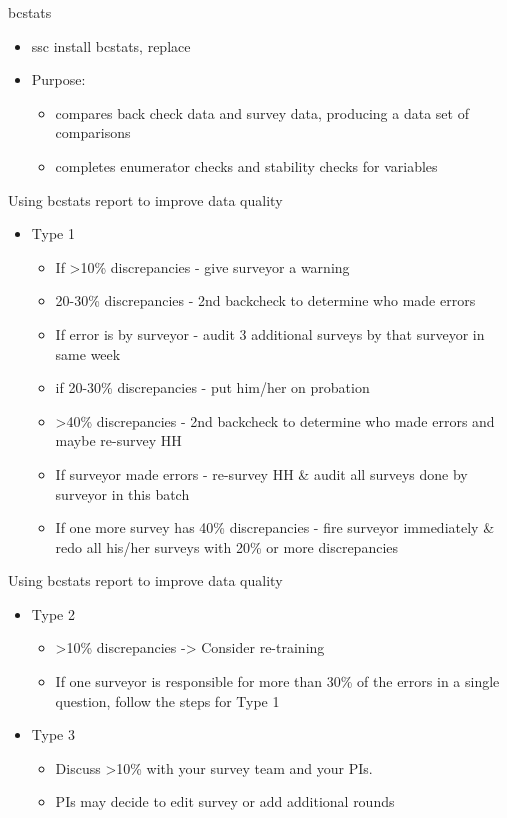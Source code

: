 \documentclass[aspectratio=169]{beamer}
\begin{document}
\begin{frame}{bcstats}
\begin{itemize}
	\item ssc install bcstats, replace
	\item Purpose:
	\begin{itemize}
		\item compares back check data and survey data, producing a data set of comparisons
		\item completes enumerator checks and stability checks for variables
	\end{itemize}
\end{itemize}
\end{frame}

\begin{frame}{Using bcstats report to improve data quality}
\begin{itemize}
	\item Type 1
		\begin{itemize}
			\item If >10\% discrepancies  - give surveyor a warning
			\item 20-30\% discrepancies - 2nd backcheck to determine who made errors
			\item If error is by surveyor  - audit 3 additional surveys by that surveyor in same week 
			\item if 20-30\% discrepancies -  put him/her on probation
			\item >40\% discrepancies - 2nd backcheck to determine who made errors and maybe re-survey HH 
			\item If surveyor made errors - re-survey HH \& audit all surveys done by surveyor in this batch
			\item If one more survey has 40\% discrepancies - fire surveyor immediately \& redo all his/her surveys with 20\% or more discrepancies
	\end{itemize}
\end{itemize}
\end{frame}

\begin{frame}{Using bcstats report to improve data quality}
\begin{itemize}
	\item Type 2
		\begin{itemize}
			\item >10\% discrepancies -> Consider re-training
			\item If one surveyor is responsible for more than 30\% of the errors in a single question, follow the steps for Type 1
		\end{itemize}
	\item Type 3
		\begin{itemize}
			\item Discuss >10\% with your survey team and your PIs. 
			\item PIs may decide to edit survey or add additional rounds
		\end{itemize}
\end{itemize}
\end{frame}
\end{document}
